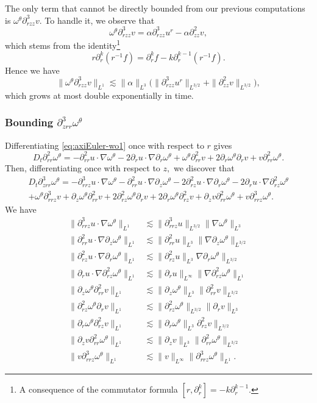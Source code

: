 \documentclass[11pt]{amsart}
\numberwithin{equation}{section}
\def\d{\partial}
\begin{document}
The only term that cannot be directly bounded from our previous computations is $\omega^\theta\d^3_{rzz} v .$ To handle it, we observe that
$$\omega^\theta\d^3_{rzz} v =\alpha \d^3_{rzz}u^r-\alpha\d^2_{zz}v,$$
which stems from the identity\footnote{A consequence of the commutator formula $[r,\d^k_{r}] = - k\d_{r}^{k-1}.$}
\begin{equation}\label{eq:com}
	r \partial^k_{r}(r^{-1}f) =  \partial_r^k f - k \d_{r}^{k-1}(r^{-1}f).\end{equation}
	Hence we have 
$$\|\omega^\theta\d^3_{rzz} v \|_{L^1} \lesssim\|\alpha \|_{L^3}\bigl(\|\d^3_{rzz}u^r\|_{L^{3/2}}
+\|\d^2_{zz}v\|_{L^{3/2}}\bigr),$$
which grows at most double exponentially in time. 

\subsubsection*{Bounding  $\d^3_{zrr}\omega^\theta$ }
Differentiating  \eqref{eq:axiEuler-wo1} once with respect to $r$ gives
\begin{equation}\label{eq:axiEuler-wo2}
D_t\d^2_{rr}\omega^\theta= -\d^2_{rr}u\cdot\nabla\omega^\theta-2\d_ru\cdot\nabla\d_r\omega^\theta
+\omega^\theta\d^2_{rr}v+2\d_r\omega^\theta\d_rv+ v\d^2_{rr}\omega^\theta.\end{equation}
Then, differentiating once with respect to $z,$ we discover that
\begin{multline*}
D_t\d^3_{zrr}\omega^\theta= -\d^3_{rrz}u\cdot\nabla\omega^\theta -\d^2_{rr}u\cdot\nabla\d_z\omega^\theta
-2\d^2_{rz}u\cdot\nabla\d_r\omega^\theta-2\d_ru\cdot\nabla\d^2_{rz}\omega^\theta\\
+\omega^\theta\d^3_{rrz}v+\d_z\omega^\theta\d^2_{rr}v
+2\d^2_{rz}\omega^\theta\d_rv+2\d_r\omega^\theta\d^2_{rz}v
+ \d_zv\d^2_{rr}\omega^\theta+ v\d^3_{rrz}\omega^\theta.
\end{multline*}
We have
\begin{align*}
\|\d^3_{rrz}u\cdot\nabla\omega^\theta\|_{L^1}&\lesssim \|\d^3_{rrz}u\|_{L^{3/2}}\|\nabla\omega^\theta\|_{L^3}\\
\|\d^2_{rr}u\cdot\nabla\d_z\omega^\theta\|_{L^1}&\lesssim\|\d^2_{rr}u\|_{L^3}\|\nabla\d_z\omega^\theta\|_{L^{3/2}} \\ 
\|\d^2_{rz}u\cdot\nabla\d_r\omega^\theta\|_{L^1}&\lesssim\|\d^2_{rz}u\|_{L^3}\nabla\d_r\omega^\theta\|_{L^{3/2}} \\
\|\d_ru\cdot\nabla\d^2_{rz}\omega^\theta\|_{L^1}&\lesssim \|\d_ru\|_{L^\infty}\|\nabla\d^2_{rz}\omega^\theta\|_{L^1}\\
\|\d_z\omega^\theta\d^2_{rr}v\|_{L^1}&\lesssim\|\d_z\omega^\theta\|_{L^3}\|\d^2_{rr}v\|_{L^{3/2}} \\
\|\d^2_{rz}\omega^\theta\d_rv\|_{L^1}&\lesssim\|\d^2_{rz}\omega^\theta\|_{L^{3/2}}\|\d_rv\|_{L^3} \\
\|\d_r\omega^\theta\d^2_{rz}v\|_{L^1}&\lesssim\|\d_r\omega^\theta\|_{L^3}\d^2_{rz}v\|_{L^{3/2}} \\
\| \d_zv\d^2_{rr}\omega^\theta\|_{L^1}&\lesssim\| \d_zv\|_{L^3}\|\d^2_{rr}\omega^\theta\|_{L^{3/2}} \\
\|v\d^3_{rrz}\omega^\theta\|_{L^1}&\lesssim \|v\|_{L^\infty}\|\d^3_{rrz}\omega^\theta\|_{L^1}.
\end{align*}
\end{document}
